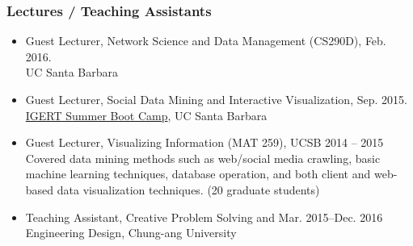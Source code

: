 \documentclass[10pt]{article}
\newenvironment{innerlist}[1][\enskip\textbullet]%
        {\begin{itemize}[#1,leftmargin=*,parsep=0pt,itemsep=0pt,topsep=0pt,partopsep=0pt]}
        {\end{itemize}}
\begin{document}
\subsubsection*{Lectures / Teaching Assistants}
\begin{innerlist}
   \item[--] Guest Lecturer, Network Science and Data Management (CS290D), \hfill{Feb. 2016.}\\UC Santa Barbara
   \item[--] Guest Lecturer, Social Data Mining and Interactive Visualization, \hfill{Sep. 2015.}\\ \href{http://networkscience.igert.ucsb.edu/education/summer-boot-camp}{IGERT Summer Boot Camp}, UC Santa Barbara
   \item[--] Guest Lecturer, Visualizing Information (MAT 259), UCSB \hfill{2014 -- 2015}\\ Covered data mining methods such as web/social media crawling, basic machine learning techniques, database operation, and both client and web-based data visualization techniques. (20 graduate students)
   \item[--] Teaching Assistant, Creative Problem Solving and \hfill{Mar. 2015--Dec. 2016}\\ Engineering Design, Chung-ang University
\end{innerlist}
\end{document}
